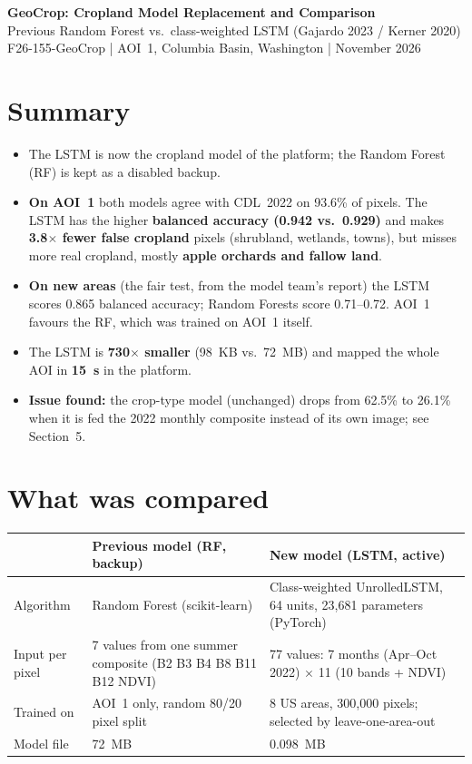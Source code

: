 \documentclass[11pt,a4paper]{article}
\begin{document}
{\Large\bfseries GeoCrop: Cropland Model Replacement and Comparison}\\[2pt]
{\large Previous Random Forest vs.\ class-weighted LSTM (Gajardo 2023 / Kerner 2020)}\\[2pt]
{\small F26-155-GeoCrop \;|\; AOI~1, Columbia Basin, Washington \;| November 2026}

\section*{Summary}
\begin{itemize}
  \item The LSTM is now the cropland model of the platform; the Random Forest (RF) is kept as a disabled backup.
  \item \textbf{On AOI~1} both models agree with CDL~2022 on 93.6\% of pixels. The LSTM has the higher
        \textbf{balanced accuracy (0.942 vs.\ 0.929)} and makes \textbf{3.8$\times$ fewer false cropland} pixels
        (shrubland, wetlands, towns), but misses more real cropland, mostly \textbf{apple orchards and fallow land}.
  \item \textbf{On new areas} (the fair test, from the model team's report) the LSTM scores 0.865 balanced accuracy;
        Random Forests score 0.71--0.72. AOI~1 favours the RF, which was trained on AOI~1 itself.
  \item The LSTM is \textbf{730$\times$ smaller} (98~KB vs.\ 72~MB) and mapped the whole AOI in \textbf{15~s} in the platform.
  \item \textcolor{bad}{\textbf{Issue found:}} the crop-type model (unchanged) drops from 62.5\% to 26.1\% when it is fed
        the 2022 monthly composite instead of its own image; see Section~5.
\end{itemize}

\section{What was compared}
\begin{tabularx}{\textwidth}{L{3.3cm} Y Y}
\toprule
 & \textbf{Previous model (RF, backup)} & \textbf{New model (LSTM, active)}\\
\midrule
Algorithm & Random Forest (scikit-learn) & Class-weighted UnrolledLSTM, 64 units, 23{,}681 parameters (PyTorch)\\
Input per pixel & 7 values from one summer composite (B2 B3 B4 B8 B11 B12 NDVI) & 77 values: 7 months (Apr--Oct 2022) $\times$ 11 (10 bands + NDVI)\\
Trained on & AOI~1 only, random 80/20 pixel split & 8 US areas, 300{,}000 pixels; selected by leave-one-area-out\\
Model file & 72~MB & 0.098~MB\\
\bottomrule
\end{tabularx}
\end{document}
